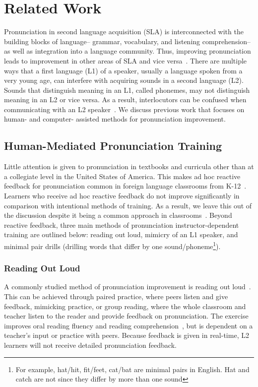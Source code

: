 \section{Related Work}
Pronunciation in second language acquisition (SLA) is interconnected with the building blocks of language-- grammar, vocabulary, and listening comprehension-- as well as integration into a language community. Thus, improving pronunciation leads to improvement in other areas of SLA and vice versa~\cite{sicola2015integrating,derwing2003esl}.  There are multiple ways that a first language (L1) of a speaker, usually a language spoken from a very young age, can interfere with acquiring sounds in a second language (L2). Sounds that distinguish meaning in an L1, called phonemes, may not distinguish meaning in an L2 or vice versa. As a result, interlocutors can be confused when communicating with an L2 speaker~\cite{rao2019key}. We discuss previous work that focuses on human- and computer- assisted methods for pronunciation improvement. 

\subsection{Human-Mediated Pronunciation Training}
Little attention is given to pronunciation in textbooks and curricula other than at a collegiate level in the United States of America. This makes ad hoc reactive feedback for pronunciation common in foreign language classrooms from K-12~\cite{rao2019key,wei2006literature,darcy2021window}. Learners who receive ad hoc reactive feedback do not improve significantly in comparison with intentional methods of training. As a result, we leave this out of the discussion despite it being a common approach in classrooms~\cite{darcy2021window}. Beyond reactive feedback, three main methods of pronunciation instructor-dependent training are outlined below: reading out loud, mimicry of an L1 speaker, and minimal pair drills (drilling words that differ by one sound/phoneme\footnote{For example, hat/hit, fit/feet, cat/bat are minimal pairs in English. Hat and catch are not since they differ by more than one sound}).  

\subsubsection{Reading Out Loud}
\label{sec:reading}
A commonly studied method of pronunciation improvement is reading out loud~\cite{thomson_effectiveness_2015, chenRetAssist2024}. This can be achieved through paired practice, where peers listen and give feedback, mimicking practice, or group reading, where the whole classroom and teacher listen to the reader and provide feedback on pronunciation. The exercise improves oral reading fluency and reading comprehension~\cite{han2016integrating}, but is dependent on a teacher's input or practice with peers. Because feedback is given in real-time, L2 learners will not receive detailed pronunciation feedback.

